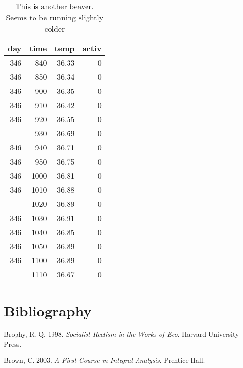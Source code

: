 \documentclass[12pt,english,a4paper,oneside,]{book} %
\theoremstyle{definition}
\theoremstyle{definition}
\theoremstyle{definition}
\theoremstyle{remark}
\begin{document}
\begin{table}

\caption{\label{tab:beaver-1}This is another beaver. Seems to be running slightly colder}
\centering
\begin{tabular}[t]{rrrr}
\toprule
day & time & temp & activ\\
\midrule
346 & 840 & 36.33 & 0\\
346 & 850 & 36.34 & 0\\
346 & 900 & 36.35 & 0\\
346 & 910 & 36.42 & 0\\
346 & 920 & 36.55 & 0\\
\addlinespace
346 & 930 & 36.69 & 0\\
346 & 940 & 36.71 & 0\\
346 & 950 & 36.75 & 0\\
346 & 1000 & 36.81 & 0\\
346 & 1010 & 36.88 & 0\\
\addlinespace
346 & 1020 & 36.89 & 0\\
346 & 1030 & 36.91 & 0\\
346 & 1040 & 36.85 & 0\\
346 & 1050 & 36.89 & 0\\
346 & 1100 & 36.89 & 0\\
\addlinespace
346 & 1110 & 36.67 & 0\\
\bottomrule
\end{tabular}
\end{table}

\backmatter

\hypertarget{bibliography}{%
\chapter*{Bibliography}\label{bibliography}}

\begingroup
\hspace{\parindent}
\setlength{\parindent}{-0.25in}
\setlength{\leftskip}{0.25in}
\setlength{\parskip}{0pt}

\hypertarget{refs}{}
\leavevmode\hypertarget{ref-Brophy1998}{}%
Brophy, R. Q. 1998. \emph{Socialist Realism in the Works of Eco}. Harvard University Press.

\leavevmode\hypertarget{ref-cite:2}{}%
Brown, C. 2003. \emph{A First Course in Integral Analysis}. Prentice Hall.
\end{document}
